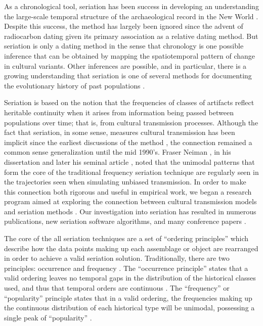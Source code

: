 As a chronological tool, seriation has been success in developing an
understanding the large-scale temporal structure of the archaeological
record in the New World
\citep{Beals1945, Bluhm1951, Evans1955, Ford1949, Kidder1917, Mayer-Oakes1955, Meggers1957, Phillips1951, Rouse1939, Smith1950}.
Despite this success, the method has largely been ignored since the
advent of radiocarbon dating given its primary association as a relative
dating method. But seriation is only a dating method in the sense that
chronology is one possible inference that can be obtained by mapping the
spatiotemporal pattern of change in cultural variants. Other inferences
are possible, and in particular, there is a growing understanding that
seriation is one of several methods for documenting the evolutionary history of
past populations
\citep{Lipo1997Population,Lipo2000, Lipo2001,Lipo2001a,Lipo2005,lipomadsen1997,lipomadsendunnell2015,Neiman1995,OBrien1999b,Teltser1995}.

Seriation is based on the notion that the frequencies of classes of
artifacts reflect heritable continuity when it arises from information
being passed between populations over time; that is, from cultural
transmission processes. Although the fact that seriation, in some sense,
measures cultural transmission has been implicit since the earliest
discussions of the method \citep[e.g.,][]{Kroeber1923}, the connection
remained a common sense generalization until the mid 1990's. Fraser
Neiman \citeyearpar{Neiman1990}, in his dissertation and later his seminal
  article \citep{Neiman1995}, noted that the unimodal patterns that
form the core of the traditional frequency seriation technique are
regularly seen in the trajectories seen when simulating unbiased
transmission. In order to make this connection both rigorous and useful
in empirical work, we began a research program aimed at exploring the
connection between cultural transmission models and seriation methods
\citep{Lipo1997Population}. Our investigation into seriation has
resulted in numerous publications, new seriation software algorithms,
and many conference papers
\citep{Lipo2008, Lipo2001neutrality, Lipo2001a, Lipo2005, lipomadsen1997, lipomadsendunnell2015, Madsen2014, madsenlipo2015b, Madsen2008, o2015design}.

The core of the all seriation techniques are a set of ``ordering
principles'' which describe how the data points making up each
assemblage or object are rearranged in order to achieve a valid
seriation solution. Traditionally, there are two principles: occurrence
and frequency \citep{Dunnell:1970aa, Rouse1967, Whitlam:1981vs}. The
``occurrence principle'' states that a valid ordering leaves no temporal
gaps in the distribution of the historical classes used, and thus that
temporal orders are continuous
\citep{dempsey1963statistical, rowe1959archaeological}. The
``frequency'' or ``popularity'' principle states that in a valid
ordering, the frequencies making up the continuous distribution of each
historical type will be unimodal, possessing a single peak of
``popularity'' \citep{Nelson1916}.

